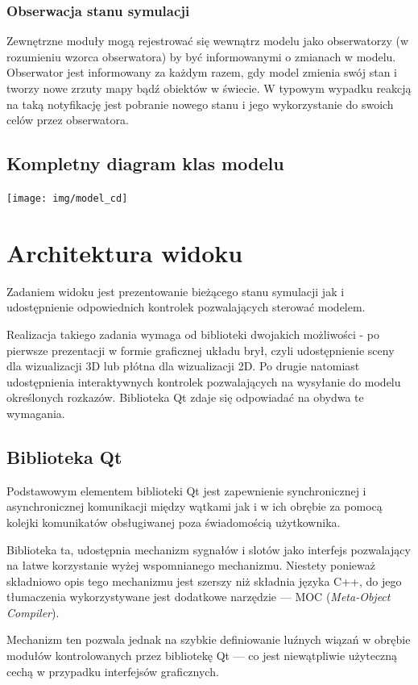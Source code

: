 {{\subsubsection{Obserwacja stanu symulacji}
\par{
Zewnętrzne moduły mogą rejestrować się wewnątrz modelu jako obserwatorzy (w rozumieniu wzorca obserwatora) by być informowanymi o zmianach w modelu. Obserwator jest informowany za każdym razem, gdy model zmienia swój stan i tworzy nowe zrzuty mapy bądź obiektów w świecie. W typowym wypadku reakcją na taką notyfikację jest pobranie nowego stanu i jego wykorzystanie do swoich celów przez obserwatora.
}
\subsection{Kompletny diagram klas modelu}
\par{
\begin{center}
\texttt{[image: img/model\_cd]}
\end{center}
}

\section[Architektura widoku][Architektura widoku]{Architektura widoku}
\par{
Zadaniem widoku jest prezentowanie bieżącego stanu symulacji jak i udostępnienie odpowiednich kontrolek pozwalających sterować modelem.
}
\par{
Realizacja takiego zadania wymaga od biblioteki dwojakich możliwości - po pierwsze prezentacji w formie graficznej układu brył, czyli udostępnienie sceny dla wizualizacji 3D lub płótna dla wizualizacji 2D. Po drugie natomiast udostępnienia interaktywnych kontrolek pozwalających na wysyłanie do modelu określonych rozkazów. Biblioteka Qt zdaje się odpowiadać na obydwa te wymagania.
}
\subsection{Biblioteka Qt}
\par{
Podstawowym elementem biblioteki Qt jest zapewnienie synchronicznej i asynchronicznej komunikacji między wątkami jak i w ich obrębie za pomocą kolejki komunikatów obsługiwanej poza świadomością użytkownika.
}
\par{
Biblioteka ta, udostępnia mechanizm sygnałów i slotów jako interfejs pozwalający na łatwe korzystanie wyżej wspomnianego mechanizmu. Niestety ponieważ składniowo opis tego mechanizmu jest szerszy niż składnia języka C++, do jego tłumaczenia wykorzystywane jest dodatkowe narzędzie --- MOC (\textit{Meta-Object Compiler}).
}
\par{
Mechanizm ten pozwala jednak na szybkie definiowanie luźnych wiązań w obrębie modułów kontrolowanych przez bibliotekę Qt --- co jest niewątpliwie użyteczną cechą w przypadku interfejsów graficznych.
}
}}

